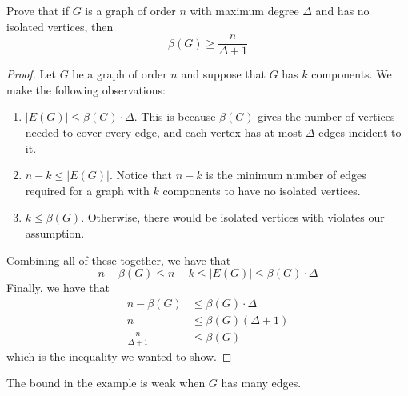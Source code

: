 \begin{nexample}
  Prove that if \(G\) is a graph of order \(n\) with maximum degree \(\Delta\)
  and has no isolated vertices, then 
  \[ \beta(G) \geq \frac{n}{\Delta + 1} \]

  \begin{proof}
    Let \(G\) be a graph of order \(n\) and suppose that \(G\) has \(k\)
    components. We make the following observations:
    \begin{enumerate}
      \item \(|E(G)| \leq \beta(G) \cdot \Delta\). This is because
        \(\beta(G)\) gives the number of vertices needed to cover every edge,
        and each vertex has at most \(\Delta\) edges incident to it.
      \item \(n-k \leq |E(G)|\). Notice that \(n-k\) is the minimum number of
        edges required for a graph with \(k\) components to have no isolated
        vertices.
      \item \(k \leq \beta(G)\). Otherwise, there would be isolated vertices
        with violates our assumption.
    \end{enumerate}
    Combining all of these together, we have that
    \[ n-\beta(G) \leq n-k \leq |E(G)| \leq \beta(G) \cdot \Delta \]
    Finally, we have that 
    \[
    \begin{aligned}
      n - \beta(G) &\leq \beta(G) \cdot \Delta \\ 
      n &\leq \beta(G) (\Delta + 1) \\ 
      \frac{n}{\Delta + 1} &\leq \beta(G)
    \end{aligned}
    \]
    which is the inequality we wanted to show.
  \end{proof}
\end{nexample}

\begin{remark}
  The bound in the example is weak when \(G\) has many edges. 
\end{remark}
